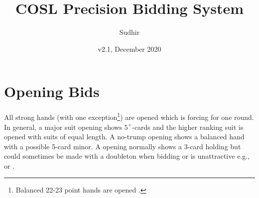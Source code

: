 \documentclass[a4paper,article,oneside]{memoir}
\newcommand{\vone}[1]{{\color{v1color}#1}}
\begin{document}
\title{COSL Precision Bidding System}
\author{Sudhir}
\date{v2.1, December 2020}
\maketitle

\tableofcontents

\pagebreak

\section{Opening Bids}

All strong hands (\vone{with one exception}\footnote{Balanced 22-23
  point hands are opened .}) are opened  which is forcing
for one round. In general, a major suit opening shows $5^+$-cards and
the higher ranking suit is opened with suits of equal length. A
no-trump opening shows a balanced hand with a possible 5-card minor. A
 opening normally shows a 3-card holding but could sometimes be
made with a doubleton when bidding  or  is unattractive
e.g.,  or .
\end{document}
